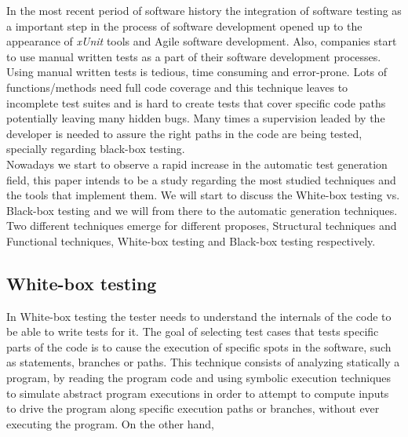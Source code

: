 \documentclass[citeauthoryear]{llncs}
\newcommand{\xunit}{\textit{xUnit}}
\begin{document}
In the most recent period of software history the integration of software testing as a important step in the process of
software development opened up to the appearance of \xunit\cite{xunit} tools and Agile software development.
Also, companies start to use manual written tests as a part of their software development processes.\\
Using  manual written tests is tedious, time consuming and error-prone. Lots of functions/methods need full code coverage and this technique leaves
to incomplete test suites and is hard to create tests that cover specific code paths potentially leaving many hidden bugs. Many times a supervision leaded by the developer
is needed to assure the right paths in the code are being tested, specially regarding black-box testing.\\
\indent Nowadays we start to observe a rapid increase in the automatic test generation field, this paper intends to be a study regarding the most studied techniques
and the tools that implement them. We will start to discuss the White-box testing vs. Black-box testing and we will from there to the automatic generation techniques.\\

Two different techniques emerge for different proposes, Structural techniques and Functional techniques,
White-box testing and Black-box\cite{black} testing respectively.

\subsection{White-box testing}
In White-box testing the tester needs to understand the internals of the code to be able to write tests for it.
The goal of selecting test cases that tests specific parts of the code is to cause the execution of specific spots in the software, such as statements, branches or
paths. This technique consists of analyzing statically a program, by reading the program code and using symbolic execution techniques to simulate abstract program
executions in order to attempt to compute inputs to drive the program along specific execution paths or branches, without ever executing the program.
On the other hand,

\end{document}
